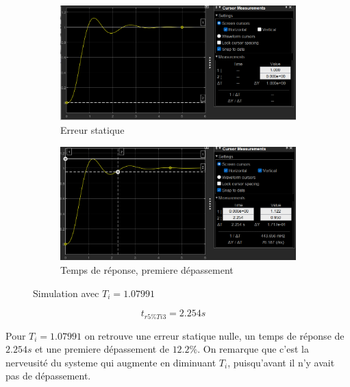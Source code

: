\documentclass[12pt, a4paper]{report}
\begin{document}
\begin{figure}[H]
    \begin{subfigure}[h!]{0.4\linewidth}
        \includegraphics[width=\linewidth]{sim2ti3errur.png}
        \caption{Erreur statique}
    \end{subfigure}
    \hfill    
    \begin{subfigure}[h!]{0.4\linewidth}
        \includegraphics[width=\linewidth]{sim2ti3deptr.png}
        \caption{Temps de réponse, premiere dépassement}
    \end{subfigure}
    \caption{Simulation avec $T_i = 1.07991$}
    \label{fig:sim2KTi3}
\end{figure}

\[
    t_{r5\%Ti3} =   2.254s \quad
\]

Pour $T_i = 1.07991$ on retrouve une erreur statique nulle, un temps de réponse de $2.254s$ et une premiere dépassement de
$12.2\%$. On remarque que c'est la nerveusité du systeme qui augmente en diminuant $T_i$, puisqu'avant il n'y avait pas de dépassement.
\end{document}
